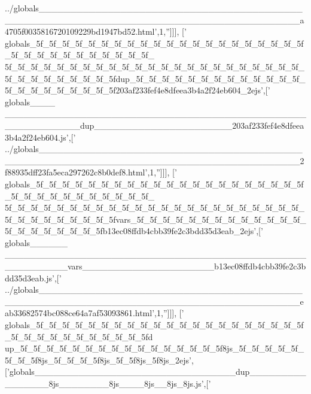 \begin{DoxyCode}
{      ../globals\_\_\_\_\_\_\_\_\_\_\_\_\_\_\_\_\_\_\_\_\_\_\_\_\_\_\_\_\_\_\_\_\_\_\_\_\_\_\_\_\_\_\_\_\_\_\_\_\_\_\_\_\_\_\_\_\_\_\_\_\_\_\_\_\_\_\_\_\_\_\_\_\_\_\_\_\_\_\_\_\_\_\_\_\_\_\_\_\_a4705f0035816720109229bd1947bd52.html'},1,\textcolor{stringliteral}{''}]]],
  [\textcolor{stringliteral}{'
      globals\_5f\_5f\_5f\_5f\_5f\_5f\_5f\_5f\_5f\_5f\_5f\_5f\_5f\_5f\_5f\_5f\_5f\_5f\_5f\_5f\_5f\_5f\_5f\_5f\_5f\_5f\_5f\_5f\_5f\_5f\_5f\_5f\_
      5f\_5f\_5f\_5f\_5f\_5f\_5f\_5f\_5f\_5f\_5f\_5f\_5f\_5f\_5f\_5f\_5f\_5f\_5f\_5f\_5f\_5f\_5f\_5f\_5f\_5f\_5f\_5f\_5f\_5f\_5f\_5fdup\_5f\_5f\_5f\_5f\_5f\_5f\_5f\_5f\_5f\_5f\_5f\_5f\_5f\_5f\_5f\_5f\_5f\_5f\_5f\_5f\_5f\_5f203af233fef4e8dfeea3b4a2f24eb604\_2ejs'},[\textcolor{stringliteral}{'
      globals\_\_\_\_
      \_\_\_\_\_\_\_\_\_\_\_\_\_\_\_\_\_\_\_\_\_\_\_\_\_\_\_\_\_\_\_\_\_\_\_\_\_\_\_\_\_\_\_\_\_\_\_\_\_\_\_\_\_\_\_\_\_\_\_\_dup\_\_\_\_\_\_\_\_\_\_\_\_\_\_\_\_\_\_\_\_\_\_203af233fef4e8dfeea3b4a2f24eb604.js'},[\textcolor{stringliteral}{'
      ../globals\_\_\_\_\_\_\_\_\_\_\_\_\_\_\_\_\_\_\_\_\_\_\_\_\_\_\_\_\_\_\_\_\_\_\_\_\_\_\_\_\_\_\_\_\_\_\_\_\_\_\_\_\_\_\_\_\_\_\_\_\_\_\_\_\_\_\_\_\_\_\_\_\_\_\_\_\_\_\_\_\_\_\_\_\_\_\_\_\_2f88935dff23fa5eca297262c8b0def8.html'},1,\textcolor{stringliteral}{''}]]],
  [\textcolor{stringliteral}{'
      globals\_5f\_5f\_5f\_5f\_5f\_5f\_5f\_5f\_5f\_5f\_5f\_5f\_5f\_5f\_5f\_5f\_5f\_5f\_5f\_5f\_5f\_5f\_5f\_5f\_5f\_5f\_5f\_5f\_5f\_5f\_5f\_5f\_
      5f\_5f\_5f\_5f\_5f\_5f\_5f\_5f\_5f\_5f\_5f\_5f\_5f\_5f\_5f\_5f\_5f\_5f\_5f\_5f\_5f\_5f\_5f\_5f\_5f\_5f\_5f\_5f\_5f\_5f\_5f\_5fvars\_5f\_5f\_5f\_5f\_5f\_5f\_5f\_5f\_5f\_5f\_5f\_5f\_5f\_5f\_5f\_5f\_5f\_5f\_5f\_5f\_5fb13ec08ffdb4cbb39fe2c3bdd35d3eab\_2ejs'},[\textcolor{stringliteral}{'
      globals\_\_\_\_\_\_
      \_\_\_\_\_\_\_\_\_\_\_\_\_\_\_\_\_\_\_\_\_\_\_\_\_\_\_\_\_\_\_\_\_\_\_\_\_\_\_\_\_\_\_\_\_\_\_\_\_\_\_\_\_\_\_\_\_\_vars\_\_\_\_\_\_\_\_\_\_\_\_\_\_\_\_\_\_\_\_\_b13ec08ffdb4cbb39fe2c3bdd35d3eab.js'},[\textcolor{stringliteral}{'
      ../globals\_\_\_\_\_\_\_\_\_\_\_\_\_\_\_\_\_\_\_\_\_\_\_\_\_\_\_\_\_\_\_\_\_\_\_\_\_\_\_\_\_\_\_\_\_\_\_\_\_\_\_\_\_\_\_\_\_\_\_\_\_\_\_\_\_\_\_\_\_\_\_\_\_\_\_\_\_\_\_\_\_\_\_\_\_\_\_\_\_eab33682574bc088ce64a7af53093861.html'},1,\textcolor{stringliteral}{''}]]],
  [\textcolor{stringliteral}{'
      globals\_5f\_5f\_5f\_5f\_5f\_5f\_5f\_5f\_5f\_5f\_5f\_5f\_5f\_5f\_5f\_5f\_5f\_5f\_5f\_5f\_5f\_5f\_5f\_5f\_5f\_5f\_5f\_5f\_5f\_5f\_5f\_5fd
      up\_5f\_5f\_5f\_5f\_5f\_5f\_5f\_5f\_5f\_5f\_5f\_5f\_5f\_5f\_5f\_5f8js\_5f\_5f\_5f\_5f\_5f\_5f\_5f\_5f8js\_5f\_5f\_5f\_5f8js\_5f\_5f8js\_5f8js\_2ejs'},[\textcolor{stringliteral}{'globals\_\_\_\_\_\_\_\_\_\_\_\_\_\_\_\_\_\_\_\_\_\_\_\_\_\_\_\_\_\_\_\_dup\_\_\_\_\_\_\_\_\_\_\_\_\_\_\_\_8js\_\_\_\_\_\_\_\_8js\_\_\_\_8js\_\_8js\_8js.js'},[\textcolor{stringliteral}{'
}
\end{DoxyCode}
